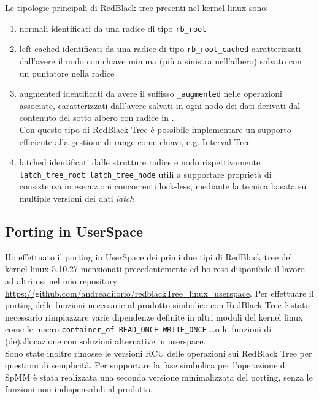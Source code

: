 \voidLine
Le tipologie principali di RedBlack tree presenti nel kernel linux sono:	\label{linuxRBTree_}
\begin{enumerate}
	\item normali  		identificati da una radice di tipo \verb|rb_root|
	\item left-cached 	identificati da una radice di tipo \verb|rb_root_cached|
		caratterizzati dall'avere il nodo con chiave minima (più a sinistra nell'albero) salvato con un puntatore nella radice
	\item augmented		identificati da avere il suffisso \verb|_augmented| nelle operazioni associate,
		caratterizzati dall'avere salvati in ogni nodo  dei dati derivati dal contenuto del sotto albero con radice in .\\
		Con questo tipo di RedBlack Tree è possibile implementare un supporto efficiente alla gestione di range come chiavi,
		e.g. Interval Tree \cite{rbtreeRst}
	\item latched		identificati dalle strutture radice e nodo rispettivamente \\ \verb|latch_tree_root latch_tree_node|
		utili a supportare proprietà di consistenza in esecuzioni concorrenti lock-less,
		mediante la tecnica basata su multiple versioni dei dati \emph{latch}
\end{enumerate}

\subsection{Porting in UserSpace} 
Ho effettuato il porting in UserSpace dei primi due tipi di RedBlack tree del kernel linux 5.10.27 menzionati precedentemente 
ed ho reso disponibile il lavoro ad altri usi nel mio repository \url{https://github.com/andreadiiorio/redblackTree_linux_userspace}.
\voidLine
Per effettuare il porting delle funzioni necessarie al prodotto simbolico con RedBlack Tree è stato necessario 
rimpiazzare varie dipendenze definite in altri moduli del kernel linux come 
le macro \verb|container_of READ_ONCE WRITE_ONCE| \dots  o le funzioni di (de)allocazione
con soluzioni alternative in userspace.\\Sono state inoltre rimosse le versioni RCU delle operazioni sui RedBlack Tree per questioni di semplicità. 
\voidLine
Per supportare la fase simbolica per l'operazione di SpMM è stata realizzata una seconda versione minimalizzata del porting,
senza le funzioni non indispensabili al prodotto.\\


